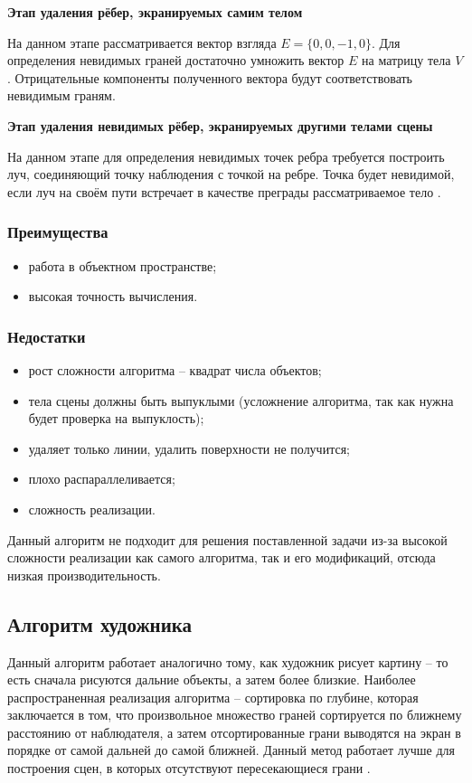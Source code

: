 \textbf{Этап удаления рёбер, экранируемых самим телом}

На данном этапе рассматривается вектор взгляда $E=\{0, 0,-1, 0\}$.
Для определения невидимых граней достаточно умножить вектор $E$ на матрицу тела $V$. Отрицательные компоненты полученного вектора будут соответствовать невидимым граням.

\textbf{Этап удаления невидимых рёбер, экранируемых другими телами сцены}

На данном этапе для определения невидимых точек ребра требуется построить луч, соединяющий точку наблюдения с точкой на ребре. Точка будет невидимой, если луч на своём пути встречает в качестве преграды рассматриваемое тело \cite{roberts}.

\subsubsection*{Преимущества}
\begin{itemize}
	\item работа в объектном пространстве;
	\item высокая точность вычисления.
\end{itemize}

\subsubsection*{Недостатки}
\begin{itemize}
	\item рост сложности алгоритма – квадрат числа объектов;
	\item тела сцены должны быть выпуклыми (усложнение алгоритма, так как нужна будет проверка на выпуклость);
	\item удаляет только линии, удалить поверхности не получится;
	\item плохо распараллеливается;
	\item сложность реализации.
\end{itemize}

Данный алгоритм не подходит для решения поставленной задачи из-за высокой сложности реализации как самого алгоритма, так и его модификаций, отсюда низкая производительность.


\subsection{Алгоритм художника}
Данный алгоритм работает аналогично тому, как художник рисует картину – то есть сначала рисуются дальние объекты, а затем более близкие. Наиболее распространенная реализация алгоритма – сортировка по глубине, которая заключается в том, что произвольное множество граней сортируется по ближнему расстоянию от наблюдателя, а затем отсортированные грани выводятся на экран в порядке от самой дальней до самой ближней. Данный метод работает лучше для построения сцен, в которых отсутствуют пересекающиеся грани \cite{hudognik}. 

